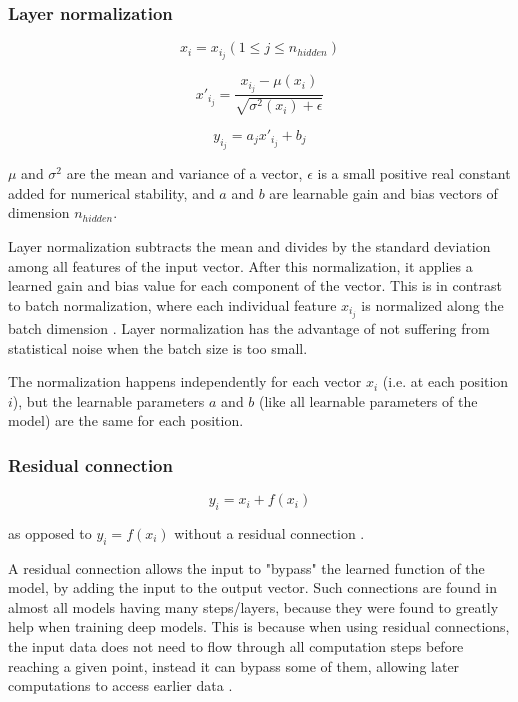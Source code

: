 \subsubsection{Layer normalization}


$$x_i = x_{i_j} (1 \leq j \leq n_{hidden})$$

$$x'_{i_j} = \frac {x_{i_j} - \mu(x_i)} {\sqrt {\sigma^2(x_i)+\epsilon}} $$

$$y_{i_j} = a_j x'_{i_j} + b_j$$

$\mu$ and $\sigma^2$ are the mean and variance of a vector, $\epsilon$ is a small positive real constant added for numerical stability, and $a$ and $b$ are learnable gain and bias vectors of dimension $n_{hidden}$.

Layer normalization subtracts the mean and divides by the standard deviation among all features of the input vector.
After this normalization, it applies a learned gain and bias value for each component of the vector.
This is in contrast to batch normalization, where each individual feature $x_{i_j}$ is normalized along the batch dimension .
Layer normalization has the advantage of not suffering from statistical noise when the batch size is too small.

The normalization happens independently for each vector $x_i$ (i.e. at each position $i$), but the learnable parameters $a$ and $b$ (like all learnable parameters of the model) are the same for each position.

\subsubsection{Residual connection}

\begin{samepage}

$$y_i = x_i + f(x_i)$$

as opposed to $y_i = f(x_i)$ without a residual connection \cite[p. 3]{allyouneed} \cite{residual}.

A residual connection allows the input to "bypass" the learned function of the model, by adding the input to the output vector.
Such connections are found in almost all models having many steps/layers, because they were found to greatly help when training deep models.
This is because when using residual connections, the input data does not need to flow through all computation steps before reaching a given point, instead it can bypass some of them, allowing later computations to access earlier data .

\end{samepage}

